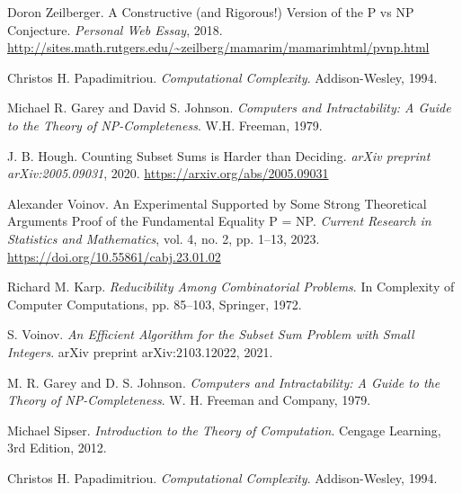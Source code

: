 \documentclass[11pt]{article}
\begin{document}
\begin{thebibliography}{99}
Doron Zeilberger.
\newblock A Constructive (and Rigorous!) Version of the P vs NP Conjecture.
\newblock \emph{Personal Web Essay}, 2018. \url{http://sites.math.rutgers.edu/~zeilberg/mamarim/mamarimhtml/pvnp.html}

Christos H. Papadimitriou.
\newblock \emph{Computational Complexity}.
\newblock Addison-Wesley, 1994.

Michael R. Garey and David S. Johnson.
\newblock \emph{Computers and Intractability: A Guide to the Theory of NP-Completeness}.
\newblock W.H. Freeman, 1979.

J. B. Hough.
\newblock Counting Subset Sums is Harder than Deciding.
\newblock \emph{arXiv preprint arXiv:2005.09031}, 2020. \url{https://arxiv.org/abs/2005.09031}

Alexander Voinov.
\newblock An Experimental Supported by Some Strong Theoretical Arguments Proof of the Fundamental Equality P = NP.
\newblock \emph{Current Research in Statistics and Mathematics}, vol. 4, no. 2, pp. 1--13, 2023. \url{https://doi.org/10.55861/cabj.23.01.02}


Richard M. Karp.
\textit{Reducibility Among Combinatorial Problems}.
In Complexity of Computer Computations, pp. 85–103, Springer, 1972.

S. Voinov. 
\textit{An Efficient Algorithm for the Subset Sum Problem with Small Integers}.
arXiv preprint arXiv:2103.12022, 2021.

M. R. Garey and D. S. Johnson.
\textit{Computers and Intractability: A Guide to the Theory of NP-Completeness}.
W. H. Freeman and Company, 1979.

Michael Sipser.
\textit{Introduction to the Theory of Computation}.
Cengage Learning, 3rd Edition, 2012.

Christos H. Papadimitriou.
\textit{Computational Complexity}.
Addison-Wesley, 1994.

\end{thebibliography}
\end{document}
